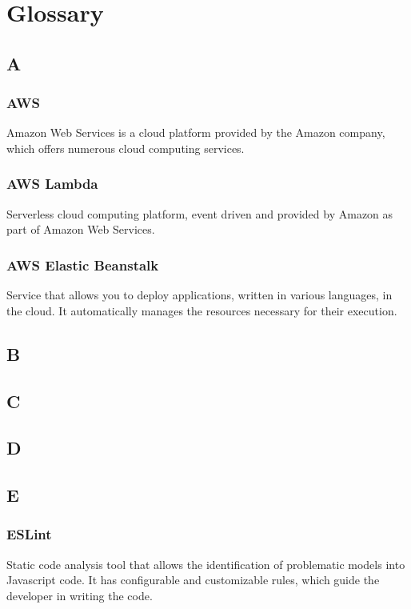\section{Glossary}

	\subsection{A}
		\subsubsection*{AWS}
			Amazon Web Services is a cloud platform provided by the Amazon company, which offers numerous cloud computing services.
		\subsubsection*{AWS Lambda}
			Serverless cloud computing platform, event driven and provided by Amazon as part of Amazon Web Services.
			
		\subsubsection*{AWS Elastic Beanstalk}
			Service that allows you to deploy applications, written in various languages, in the cloud. It automatically manages the resources necessary for their execution.
	
	\subsection{B}
	
	
	\subsection{C}
	
	
	\subsection{D}
	
	
	\subsection{E}
		\subsubsection*{ESLint}
			Static code analysis tool that allows the identification of problematic models into Javascript code. It has configurable and customizable rules, which guide the developer in writing the code.
